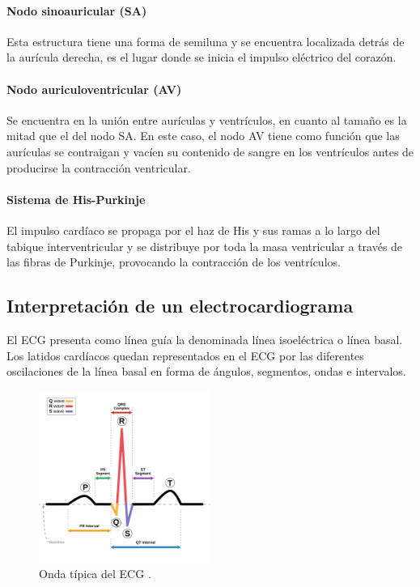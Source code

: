 \paragraph{Nodo sinoauricular (SA)}
Esta estructura tiene una forma de semiluna y se encuentra localizada detrás de la aurícula derecha, es el lugar donde se inicia el impulso eléctrico del corazón.

\paragraph{Nodo auriculoventricular (AV)}
Se encuentra en la unión entre aurículas y ventrículos, en cuanto al tamaño es la mitad que el del nodo SA. En este caso, el nodo AV tiene como función que las aurículas se contraigan y vacíen su contenido de sangre en los ventrículos antes de producirse la contracción ventricular.

\paragraph{Sistema de His-Purkinje}
El impulso cardíaco se propaga por el haz de His y sus ramas a lo largo del tabique interventricular y se distribuye por toda la masa ventricular a través de las fibras de Purkinje, provocando la contracción de los ventrículos.

\subsection{Interpretación de un electrocardiograma}

El ECG presenta como línea guía la denominada línea isoeléctrica o línea basal. Los latidos cardíacos quedan representados en el ECG por las diferentes oscilaciones de la línea basal en forma de ángulos, segmentos, ondas e intervalos.

\begin{figure}[h]
    \centering
    \includegraphics[width=0.5\textwidth]{img/ecg_wave.png}
    \caption{Onda típica del ECG \cite{wikipedia-ecg}.}
    \label{fig:ecg_wave}
\end{figure}

